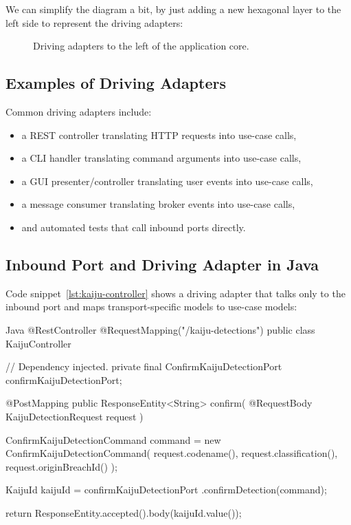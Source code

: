 We can simplify the diagram a bit, by just adding a new hexagonal layer to the left side to represent the driving adapters:

\begin{figure}[htbp]
    \centering
    
    \caption{Driving adapters to the left of the application core.}
    \label{fig:hexagonal_driving_adapters_simplified}
\end{figure}

\subsection{Examples of Driving Adapters}
\label{sec:hexagonal_driving_examples}

Common driving adapters include:
\begin{itemize}
    \item a REST controller translating HTTP requests into use-case calls,
    \item a CLI handler translating command arguments into use-case calls,
    \item a GUI presenter/controller translating user events into use-case calls,
    \item a message consumer translating broker events into use-case calls,
    \item and automated tests that call inbound ports directly.
\end{itemize}

\subsection{Inbound Port and Driving Adapter in Java}
\label{sec:hexagonal_java_driving_adapter}

Code snippet~\ref{lst:kaiju-controller} shows a driving adapter that talks only to the inbound port and maps transport-specific models to use-case models:

\begin{ridercode}{Java}
@RestController
@RequestMapping("/kaiju-detections")
public class KaijuController
{
    // Dependency injected.
    private final ConfirmKaijuDetectionPort
        confirmKaijuDetectionPort;

    @PostMapping
    public ResponseEntity<String> confirm(
        @RequestBody KaijuDetectionRequest request
    )
    {
        ConfirmKaijuDetectionCommand command =
            new ConfirmKaijuDetectionCommand(
                request.codename(),
                request.classification(),
                request.originBreachId()
            );

        KaijuId kaijuId = confirmKaijuDetectionPort
            .confirmDetection(command);

        return ResponseEntity.accepted().body(kaijuId.value());
    }
}
\end{ridercode}
\label{lst:kaiju-controller}

